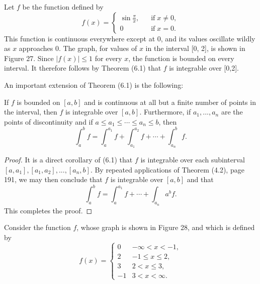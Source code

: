 \begin{example}
Let $f$ be the function defined by
$$
f(x) = \left\{ \begin{array}{ll}
\sin \frac{\pi}{x}, &\;\;\;\mbox{if}\; x \neq 0,\\
0                        &\;\;\;\mbox{if}\; x = 0.
\end{array}
\right .
$$
\noindent This function is continuous everywhere except at 0, and its values oscillate wildly as $x$ approaches 0. The graph, for values of $x$ in the interval [0, 2], is shown in Figure 27. Since $|f(x)|  \leq 1$ for every $x$, the function is bounded on every interval. It therefore follows by Theorem (6.1) that $f$ is integrable over [0,2].
\end{example}


An important extension of Theorem (6.1) is the following:

\begin{theorem} %
If $f$ is bounded on $[a, b]$ and is continuous at all but a finite number of points in the interval, then $f$ is integrable over $[a, b]$. Furthermore, if $a_1, ..., a_n$ are the points of discontinuity and if 
$a \leq a_1 \leq \cdots \leq a_n \leq b$, then
$$
\int_a^b f =  \int_a^{a_1} f + \int_{a_1}^{a_2} f + \cdots + \int_{a_n}^b f. 
$$
\end{theorem}


\begin{proof}
It is a direct corollary of (6.1) that $f$ is integrable over each subinterval $[a, a_1], [a_1, a_2], ... , [a_n, b]$. By repeated applications of Theorem (4.2), page 191, we may then conclude that $f$ is integrable over $[a, b]$ and that
$$
\int_a^b f = \int_a^{a_1} f + \cdots + \int_{a_n}a^b f.
$$
This completes the proof.
\end{proof}

Consider the function $f$, whose graph is shown in Figure 28, and which is defined by 
$$
f(x) = \left\{  \begin{array}{rc}
0           & -\infty < x < -1,  \\ 
2           & -1 \leq x \leq 2, \\
3           & 2 < x \leq 3, \\ 
-1          & 3 < x < \infty.
             \end{array}
\right .
$$



